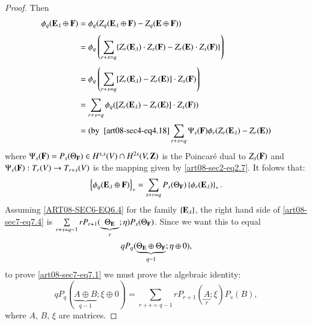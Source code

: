 \begin{proof}
Then\pageoriginale
\begin{align*}
\phi_{q}(\mathbf{E}_{\lambda}\oplus\mathbf{F}) &= \phi_{q}(Z_{q}(\mathbf{E}_{\lambda}\oplus\mathbf{F})-Z_{q}(\mathbf{E}\oplus \mathbf{F}))\\[3pt]
&= \phi_{q}\left(\sum\limits_{r+s=q}\{Z_{r}(\mathbf{E}_{\lambda})\cdot Z_{s}(\mathbf{F})-Z_{r}(\mathbf{E})\cdot Z_{s}(\mathbf{F})\}\right)\\[3pt]
&= \phi_{q}\left(\sum\limits_{r+s=q}[Z_{r}(\mathbf{E}_{\lambda})-Z_{r}(\mathbf{E})]\cdot Z_{s}(\mathbf{F})\right)\\[3pt]
&= \sum\limits_{r+s=q}\phi_{q}([Z_{r}(\mathbf{E}_{\lambda})-Z_{r}(\mathbf{E})]\cdot Z_{s}(\mathbf{F}))\\[3pt]
&= (\text{by~ } \eqref{art08-sec4-eq4.18} \sum\limits_{r+s=q}\Psi_{s}(\mathbf{F})\phi_{r}(Z_{r}(\mathbf{E}_{\lambda})-Z_{r}(\mathbf{E}))
\end{align*}
where $\Psi_{s}(\mathbf{F})=P_{s}(\Theta_{\mathbf{F}})\in H^{s,s}(V)\cap H^{2s}(V,\mathbf{Z})$ is the Poincar\'e dual to $Z_{s}(\mathbf{F})$ and $\Psi_{s}(\mathbf{F}):T_{r}(V)\to T_{r+s}(V)$ is the mapping given by \eqref{art08-sec2-eq2.7}. It folows that:
\begin{equation}
\left\{\phi_{q}(\mathbf{E}_{\lambda}\oplus \mathbf{F})\right\}_{*}=\sum\limits_{s+r=q}P_{s}(\Theta_{\mathbf{F}})\left\{\phi_{r}(\mathbf{E}_{\lambda})\right\}_{*}.\label{art08-sec7-eq7.4}
\end{equation}
Assuming \eqref{ART08-SEC6-EQ6.4} for the family $\{\mathbf{E}_{\lambda}\}$, the right hand side of \eqref{art08-sec7-eq7.4} is $\sum\limits_{r+s=q-1}rP_{r+1}(\underbrace{\Theta_{\mathbf{E}}}_{r};\eta)P_{s}(\Theta_{\mathbf{F}})$. Since we want this to equal 
$$
qP_{q}(\underbrace{\Theta_{\mathbf{E}}\oplus \Theta_{\mathbf{F}}}_{q-1};\eta\oplus 0),
$$ 
to prove \eqref{art08-sec7-eq7.1} we must prove the algebraic identity:
\begin{equation}
qP_{q}(\underbrace{A\oplus B}_{q-1};\xi\oplus 0)=\sum\limits_{r+s=q-1}rP_{r+1}(\underbrace{A}_{r};\xi)P_{s}(B),\label{art08-sec7-eq7.5}
\end{equation}
where $A$, $B$, $\xi$ are matrices.


\end{proof}
